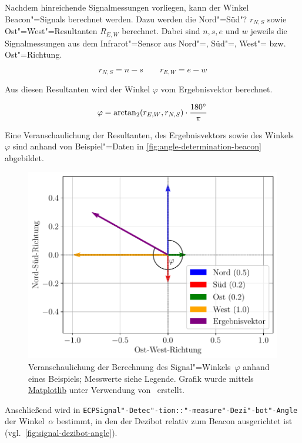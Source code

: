 Nachdem hinreichende Signalmessungen vorliegen, kann der Winkel Beacon"=Signals berechnet werden. Dazu werden die Nord"=Süd"? $r_{N,S}$ sowie Ost"=West"=Resultanten $R_{E,W}$ berechnet. Dabei sind $n,s,e$ und $w$ jeweils die Signalmessungen aus dem Infrarot"=Sensor aus Nord"=, Süd"=, West"= bzw. Ost"=Richtung.

\begin{equation*}
    r_{N,S} = n - s \qquad r_{E,W} = e - w
\end{equation*}

Aus diesen Resultanten wird der Winkel $\varphi$ vom Ergebnisvektor berechnet.

\begin{equation*}
    \varphi = \arctan_2(r_{E,W}, r_{N,S}) \cdot \frac{180^\circ}{\pi}
\end{equation*}

Eine Veranschaulichung der Resultanten, des Ergebnisvektors sowie des Winkels~$\varphi$ sind anhand von Beispiel"=Daten in \autoref{fig:angle-determination-beacon} abgebildet.

\begin{figure}[h]
    \includegraphics[width=\textwidth]{../plot/signal_direction.pdf}
    \caption{Veranschaulichung der Berechnung des Signal"=Winkels~$\varphi$ anhand eines Beispiels; Messwerte siehe Legende. Grafik wurde mittels \href{https://matplotlib.org/}{Matplotlib} unter Verwendung von~\cite{matplotlibdevelopmentteamScaleInvariantAngle} erstellt.}
    \label{fig:angle-determination-beacon}
\end{figure}

Anschließend wird in \texttt{ECPSignal"-Detec"-tion::"-measure"-Dezi"-bot"-Angle} der Winkel~$\alpha$ bestimmt, in den der Dezibot relativ zum Beacon ausgerichtet ist (vgl.~\autoref{fig:signal-dezibot-angle}).

